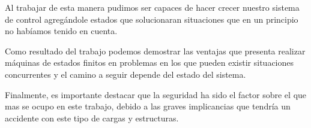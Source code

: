 \documentclass[journal]{IEEEtran}
\begin{document}
Al trabajar de esta manera pudimos ser capaces de hacer crecer nuestro sistema
de control agregándole estados que solucionaran situaciones 
que en un principio no habíamos tenido en cuenta.

Como resultado del trabajo podemos demostrar las ventajas que presenta realizar máquinas
de estados finitos en problemas en los que pueden existir situaciones concurrentes y
el camino a seguir depende del estado del sistema.

Finalmente, es importante destacar que la seguridad ha sido el factor sobre el que mas 
se ocupo en este trabajo, debido a las graves implicancias que tendría un accidente con este 
tipo de cargas y estructuras.






%



\end{document}
